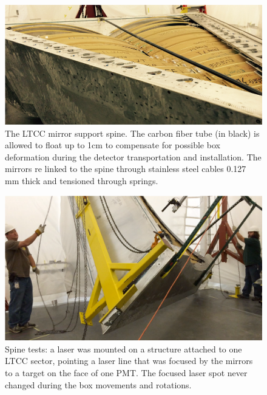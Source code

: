 \begin{figure}
	\centering
	\includegraphics[width=1.0\columnwidth,keepaspectratio]{img/spine.png}
	\caption{The LTCC mirror support spine. The carbon fiber tube (in black) is allowed to float up to 1cm to compensate for possible box deformation during the detector
            transportation and installation. The mirrors re linked to the spine through stainless steel cables 0.127 mm thick and tensioned through springs.}
	\label{fig:spine}
\end{figure}


\begin{figure}
	\centering
	\includegraphics[width=1.0\columnwidth,keepaspectratio]{img/spineTest.png}
	\caption{Spine tests: a laser was mounted on a structure attached to one LTCC sector, pointing a laser line that was focused by the mirrors to a
            target on the face of one PMT. The focused laser spot never changed during the box movements and rotations.}
	\label{fig:spineTest}
\end{figure}





